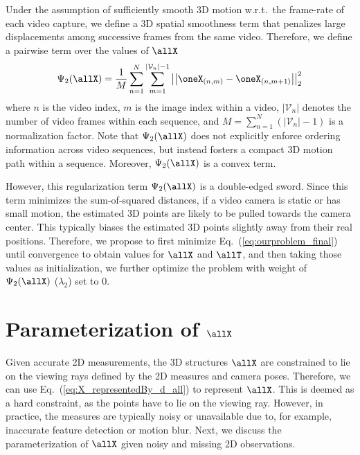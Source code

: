 Under the assumption of sufficiently smooth 3D motion w.r.t.~the frame-rate of each video capture, we define a 3D spatial smoothness term that penalizes large displacements among successive frames from the same video.
Therefore, we define a pairwise term over the values of $\allX$
\begin{equation}
\Psi_2(\allX) = \frac{1}{M} \sum_{n=1}^{N}\sum_{m=1}^{\vert\mathcal V_n\vert-1}\left|\left|\oneX_{(n,m)} - \oneX_{(n,m+1)} \right| \right|_2^2
\end{equation}
where $n$ is the video index, $m$ is the image index within a video, $\vert \mathcal V_n\vert$ denotes the number of video frames within each sequence, and $M=\sum_{n=1}^{N}(\vert \mathcal V_n\vert - 1)$ is a normalization factor.
Note that $\Psi_2(\allX)$ does not explicitly enforce ordering information across video sequences, but instead fosters a compact 3D motion path within a sequence.
Moreover,  $\Psi_2(\allX)$ is a convex term.

However, this regularization term $\Psi_2(\allX)$ is a double-edged sword.
Since this term minimizes the sum-of-squared distances, if a video camera is static or has small motion, the estimated 3D points are likely to be pulled towards the camera center. 
This typically biases the estimated 3D points slightly away from their real positions. 
Therefore, we propose to first minimize Eq.~(\ref{eq:ourproblem_final}) until convergence to obtain values for $\allX$ and $\allT$, and then taking those values as initialization, we further optimize the problem with weight of $\Psi_2(\allX)$ (\ie $\lambda_2$) set to $0$.



\section{Parameterization of $\allX$} \label{sec:parameterization}

Given accurate 2D measurements, 
the 3D structures $\allX$ are constrained to lie on the viewing rays defined by the 2D measures and camera poses. Therefore, we can use Eq.~(\ref{eq:X_representedBy_d_all}) to represent $\allX$. This is deemed as a hard constraint, as the points have to lie on the viewing ray. However, in practice, the measures are typically noisy or unavailable due to, for example, inaccurate feature detection or motion blur. 
Next, we discuss the parameterization of $\allX$ given noisy and missing 2D observations.

